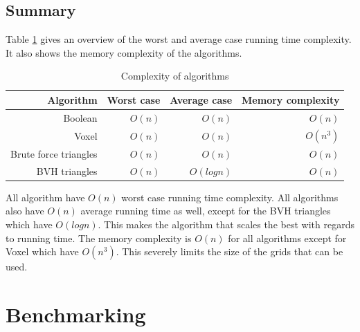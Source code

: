 \documentclass[11pt,twoside,a4paper]{report}
\begin{document}
\subsection{Summary}
Table \ref{tab:big_o_summary} gives an overview of the worst and average case running time complexity. It also shows the memory complexity of the algorithms.

\begin{table}[htbp]
  \centering
  \caption{Complexity of algorithms}
    \begin{tabular}{rrrr}
    \toprule
    Algorithm & Worst case & Average case & Memory complexity \\
    \midrule
    Boolean & $O(n)$ & $O(n)$ & $O(n)$ \\
    Voxel & $O(n)$ & $O(n)$ & $O(n^3)$ \\
    Brute force triangles  & $O(n)$ & $O(n)$ & $O(n)$ \\
    BVH triangles  & $O(n)$ & $O(log n)$ & $O(n)$ \\
    \bottomrule
    \end{tabular}%
  \label{tab:big_o_summary}%
\end{table}%

All algorithm have $O(n)$ worst case running time complexity. All algorithms also have $O(n)$ average running time as well, except for the BVH triangles which have $O(log n)$. This makes the algorithm that scales the best with regards to running time. The memory complexity is $O(n)$ for all algorithms except for Voxel which have $O(n^3)$. This severely limits the size of the grids that can be used.



\section{Benchmarking}
\label{section:results_benchmarking}
\end{document}
